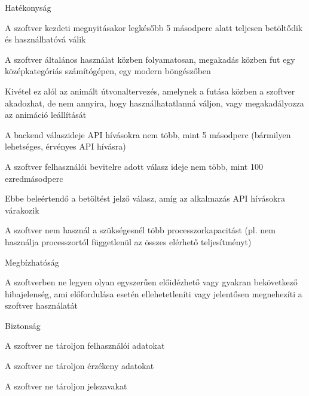 \begin{enumerate}
    \item Hatékonyság
    \begin{compactitem}     
        \item A szoftver kezdeti megnyitásakor legkésőbb 5 másodperc alatt teljesen betöltődik és használhatóvá válik
        \item A szoftver általános használat közben folyamatosan, megakadás közben fut egy középkategóriás számítógépen, egy modern böngészőben
        \begin{compactitem}     
            \item Kivétel ez alól az animált útvonaltervezés, amelynek a futása közben a szoftver akadozhat, de nem annyira, hogy használhatatlanná váljon, vagy megakadályozza az animáció leállítását
        \end{compactitem}
        \item A backend válaszideje API hívásokra nem több, mint 5 másodperc (bármilyen lehetséges, érvényes API hívásra)
        \item A szoftver felhasználói bevitelre adott válasz ideje nem több, mint 100 ezredmásodperc
        \begin{compactitem}     
            \item Ebbe beleértendő a betöltést jelző válasz, amíg az alkalmazás API hívásokra várakozik
        \end{compactitem}
        \item A szoftver nem használ a szükségesnél több processzorkapacitást (pl. nem használja processzortól függetlenül az összes elérhető teljesítményt)
    \end{compactitem}
    \item Megbízhatóság
    \begin{compactitem}
        \item A szoftverben ne legyen olyan egyszerűen előidézhető vagy gyakran bekövetkező hibajelenség, ami előfordulása esetén ellehetetleníti vagy jelentősen megnehezíti a szoftver használatát
    \end{compactitem}
    \item Biztonság
    \begin{compactitem}
        \item A szoftver ne tároljon felhasználói adatokat
        \item A szoftver ne tároljon érzékeny adatokat
        \item A szoftver ne tároljon jelszavakat
    \end{compactitem}

\end{enumerate}
